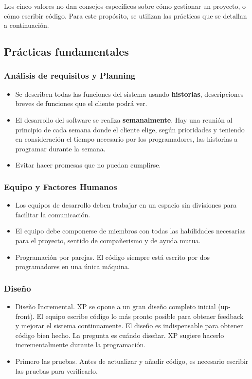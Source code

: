 Los cinco valores no dan consejos específicos sobre cómo gestionar un proyecto, o cómo
escribir código. Para este propósito, se utilizan las prácticas que se detallan a continuación.


\subsection{Prácticas fundamentales}
\subsubsection{Análisis de requisitos y Planning}
\begin{itemize}
\item Se describen todas las funciones del sistema usando \textbf{historias}, descripciones breves de funciones que el cliente podrá ver.
\item El desarrollo del software se realiza \textbf{semanalmente}. Hay una reunión al principio de cada semana donde el cliente elige, según prioridades y teniendo en consideración el tiempo necesario por los programadores, las historias a programar durante la semana.
\item Evitar hacer promesas que no puedan cumplirse. 
\end{itemize}

\subsubsection{Equipo y Factores Humanos}
\begin{itemize}
\item Los equipos de desarrollo deben trabajar en un espacio sin divisiones para facilitar la comunicación.
\item El equipo debe componerse de miembros con todas las habilidades necesarias para el proyecto, sentido de compañerismo y de ayuda mutua. 
\item Programación por parejas. El código siempre está escrito por dos programadores en una única máquina.
\end{itemize}

\subsubsection{Diseño}
\begin{itemize}
\item Diseño Incremental. XP se opone a un gran diseño completo inicial (up-front). El equipo escribe código lo más pronto posible para obtener feedback y mejorar el sistema continuamente. El diseño es indispensable para obtener código bien hecho. La pregunta es cuándo diseñar. XP sugiere hacerlo incrementalmente durante la programación.
\item Primero las pruebas. Antes de actualizar y añadir código, es necesario escribir las pruebas para verificarlo. 
\end{itemize}
